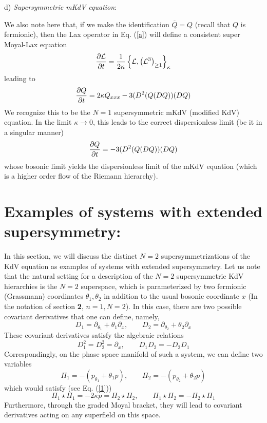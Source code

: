 \documentclass[a4paper,11pt]{article}
\begin{document}
d) {\it Supersymmetric mKdV equation}:

We also note here that, if we make the identification $\overline{Q}=Q$
(recall that $Q$ is fermionic), then the Lax operator in Eq. (\ref{a})
will define a consistent super Moyal-Lax equation
\begin{equation}
{\partial {\cal L}\over \partial t} = {1\over 2\kappa} \left\{{\cal
L}, \left({\cal L}^{3}\right)_{\geq 1}\right\}_{\kappa}
\end{equation}
leading to
\begin{equation}
{\partial Q\over \partial t} = 2\kappa Q_{xxx} - 3 (D^{2}(Q(DQ)) (DQ)
\end{equation}
We recognize this to be the $N=1$ supersymmetric mKdV (modified KdV)
equation. In the limit $\kappa\rightarrow 0$, this leads to the
correct dispersionless limit (be it in a singular manner)
\begin{equation}
{\partial Q\over \partial t} = - 3 (D^{2}(Q(DQ)) (DQ)
\end{equation}
whose bosonic limit yields the dispersionless limit of the mKdV
equation (which is a higher order flow of the Riemann hierarchy).  

\section{Examples of systems with extended supersymmetry:}
\medskip

In this section, we will discuss the distinct $N=2$
supersymmetrizations of the KdV equation as examples of systems with
extended supersymmetry. Let us note that the natural setting for a
description of the $N=2$ supersymmetric KdV
hierarchies is the $N=2$ superspace, which is parameterized by two
fermionic (Grassmann) coordinates $\theta_{1},\theta_{2}$ in addition
to the usual bosonic coordinate $x$ (In the notation of section {\bf
2}, $n=1,N=2$). In this case, there are two
possible covariant derivatives that one can define, namely,
\begin{equation}
D_{1} = \partial_{\theta_{1}} + \theta_{1} \partial_{x},\qquad D_{2} =
\partial_{\theta_{2}} + \theta_{2} \partial_{x}
\end{equation}
These covariant derivatives satisfy the algebraic relations
\begin{equation}
D_{1}^{2} = D_{2}^{2} = \partial_{x},\qquad D_{1}D_{2} = - D_{2}D_{1}
\end{equation}
Correspondingly, on the phase space manifold of such a system, we can
define two variables
\begin{equation}
\Pi_{1} = - (p_{\theta_{1}} + \theta_{1} p),\qquad \Pi_{2} = -
(p_{\theta_{2}} + \theta_{2} p)
\end{equation}
which would satisfy (see Eq. (\ref{1}))
\begin{equation}
\Pi_{1}\star \Pi_{1} = - 2\kappa p = \Pi_{2}\star \Pi_{2},\qquad
\Pi_{1}\star \Pi_{2} = - \Pi_{2}\star \Pi_{1}
\end{equation}
Furthermore, through the graded Moyal bracket, they will lead to
covariant derivatives acting on any superfield on this space.
\end{document}
